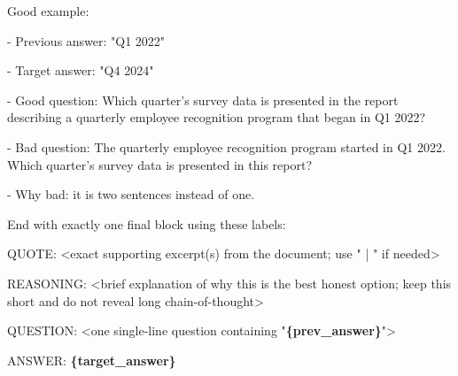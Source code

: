 \begin{tcolorbox}
\begin{scriptsize}
\mbox{}\par
Good example:\par
- Previous answer: "Q1 2022"\par
- Target answer: "Q4 2024"\par
- Good question: Which quarter's survey data is presented in the report describing a quarterly employee recognition program that began in Q1 2022?\par
- Bad question: The quarterly employee recognition program started in Q1 2022. Which quarter's survey data is presented in this report?\par
- Why bad: it is two sentences instead of one.\par
\mbox{}\par
End with exactly one final block using these labels:\par
QUOTE: \textless{}exact supporting excerpt(s) from the document; use " | " if needed\textgreater{}\par
REASONING: \textless{}brief explanation of why this is the best honest option; keep this short and do not reveal long chain-of-thought\textgreater{}\par
QUESTION: \textless{}one single-line question containing "\textcolor{my-green}{\textbf{\{prev\_answer\}}}"\textgreater{}\par
ANSWER: \textcolor{my-green}{\textbf{\{target\_answer\}}}\par
\end{scriptsize}
\end{tcolorbox}

